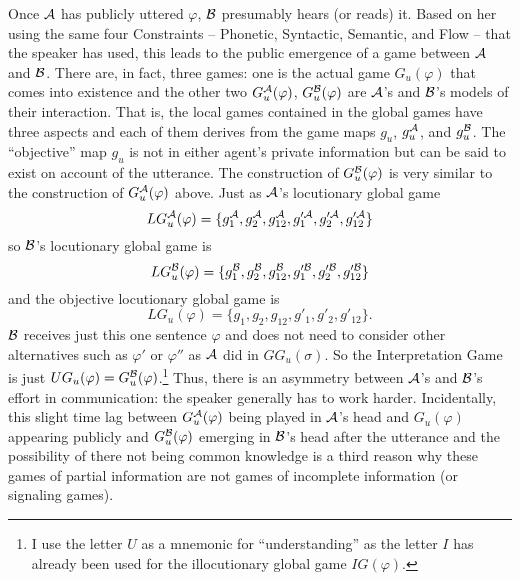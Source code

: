 Once $\cal A$ has publicly uttered $\varphi$, $\cal B$ presumably hears (or reads) it. Based on her using the same four Constraints -- Phonetic, Syntactic, Semantic, and Flow -- that the speaker has used, this leads to the public emergence of a game between $\cal A$ and $\cal B$. There are, in fact, three games: one is the actual game $G_u(\varphi)$ that comes into existence and the other two $G^{\cal A}_u(\varphi)$, $G^{\cal B}_u(\varphi)$ are $\cal A$'s and $\cal B$'s models of their interaction. That is, the local games contained in the global games have three aspects and each of them derives from the game maps $g_u$, $g^{\cal A}_u$, and $g^{\cal B}_u$. The ``objective'' map $g_u$ is not in either agent's private information but can be said to exist on account of the utterance. The construction of $G^{\cal B}_u(\varphi)$ is very similar to the construction of $G^{\cal A}_u(\varphi)$ above. Just as $\cal A$'s locutionary global game \[LG^{\cal A}_u(\varphi) = \{g^{\cal A}_1, g^{\cal A}_2, g^{\cal A}_{12}, g'^{{\cal A}}_1, g'^{{\cal A}}_2, g'^{{\cal A}}_{12}\}\] so $\cal B$'s locutionary global game is \[LG^{\cal B}_u(\varphi) = \{g^{\cal B}_1, g^{\cal B}_2,\allowbreak g^{\cal B}_{12}, g'^{{\cal B}}_1, g'^{{\cal B}}_2, g'^{{\cal B}}_{12}\}\] and the objective locutionary global game is \[LG_u(\varphi) = \{g_1, g_2,\allowbreak g_{12}, g'_1, g'_2, g'_{12}\}\text{.}\] $\cal B$ receives just this one sentence $\varphi$ and does not need to consider other alternatives such as $\varphi'$ or $\varphi''$ as $\cal A$ did in $GG_u(\sigma)$. So the Interpretation Game is just $UG_u(\varphi) = G^{\cal B}_u(\varphi)$.\footnote{I use the letter $U$ as a mnemonic for ``understanding'' as the letter $I$ has already been used for the illocutionary global game $IG(\varphi)$.} Thus, there is an asymmetry between $\cal A$'s and $\cal B$'s effort in communication: the speaker generally has to work harder. Incidentally, this slight time lag between $G^{\cal A}_u(\varphi)$ being played in $\cal A$'s head and $G_u(\varphi)$ appearing publicly and $G^{\cal B}_u(\varphi)$ emerging in $\cal B$'s head after the utterance and the possibility of there not being common knowledge is a third reason why these games of partial information are not games of incomplete information (or signaling games).

